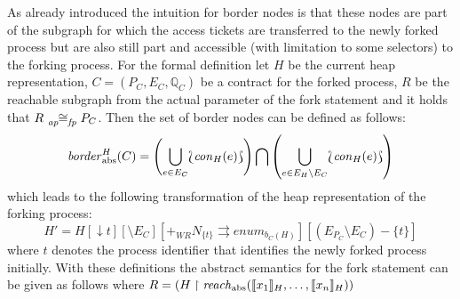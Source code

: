 	As already introduced the intuition for border nodes is that these nodes
	are part of the subgraph for which the access tickets are transferred to the
	newly forked process but are also still part and accessible (with limitation
	to some selectors) to the forking process.
	For the formal definition let $H$ be the current heap representation, 
	$C = (P_C, E_C, \mathbb{Q}_C)$ be a contract for the forked process, $R$ be
	the reachable subgraph from the actual parameter of the fork statement and
	it holds that $R\afiso P_C$. Then the set of border nodes can be defined as
	follows:
	\begin{equation*}
		\border_{\text{abs}}^{H}(C) = \left(\bigcup_{e\in E_{C}}\Lbag\con_{H}(e)
		\Rbag\right)\bigcap\left(\bigcup_{e\in E_{H}\setminus E_{C}}
		\Lbag\con_{H}(e)\Rbag\right)
	\end{equation*}
	which leads to the following transformation of the heap representation of
	the forking process:
	\begin{equation*}
		H' = H[\downarrow t][\setminus E_{C}][+_\mathit{WR}N_{\{t\}}
		\rightrightarrows \mathit{enum}_{b_{C}(H)}]
		[(E_{P_{C}}\setminus E_{C}) - \{t\}]
	\end{equation*}
	where $t$ denotes the process identifier that identifies the newly forked
	process initially.
	With these definitions the abstract semantics for the fork statement can be
	given as follows where
	$R=(H\upharpoonright \reach_{\text{abs}}(\llbracket x_{1}\rrbracket_{H},
		\dots,\llbracket x_{n}\rrbracket_{H}))$
	\begin{prooftree}
	\end{prooftree}

